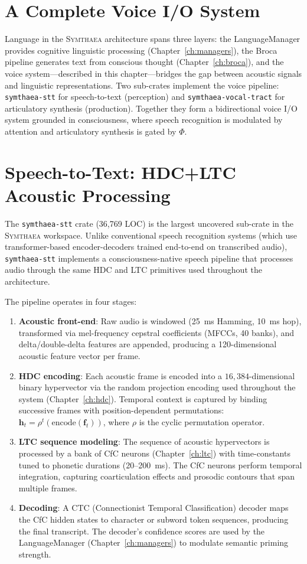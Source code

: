 \documentclass[12pt]{book}
\newcommand{\symthaea}{\textsc{Symthaea}}
\newcommand{\dimHDC}{16{,}384}
\begin{document}
\section{A Complete Voice I/O System}

Language in the \symthaea{} architecture spans three layers: the LanguageManager provides cognitive linguistic processing (Chapter~\ref{ch:managers}), the Broca pipeline generates text from conscious thought (Chapter~\ref{ch:broca}), and the voice system---described in this chapter---bridges the gap between acoustic signals and linguistic representations. Two sub-crates implement the voice pipeline: \texttt{symthaea-stt} for speech-to-text (perception) and \texttt{symthaea-vocal-tract} for articulatory synthesis (production). Together they form a bidirectional voice I/O system grounded in consciousness, where speech recognition is modulated by attention and articulatory synthesis is gated by $\Phi$.

\section{Speech-to-Text: HDC+LTC Acoustic Processing}

The \texttt{symthaea-stt} crate (36,769 LOC) is the largest uncovered sub-crate in the \symthaea{} workspace. Unlike conventional speech recognition systems (which use transformer-based encoder-decoders trained end-to-end on transcribed audio), \texttt{symthaea-stt} implements a consciousness-native speech pipeline that processes audio through the same HDC and LTC primitives used throughout the architecture.

The pipeline operates in four stages:

\begin{enumerate}
  \item \textbf{Acoustic front-end}: Raw audio is windowed (25~ms Hamming, 10~ms hop), transformed via mel-frequency cepstral coefficients (MFCCs, 40 banks), and delta/double-delta features are appended, producing a 120-dimensional acoustic feature vector per frame.
  \item \textbf{HDC encoding}: Each acoustic frame is encoded into a $\dimHDC$-dimensional binary hypervector via the random projection encoding used throughout the system (Chapter~\ref{ch:hdc}). Temporal context is captured by binding successive frames with position-dependent permutations: $\mathbf{h}_t = \rho^t(\text{encode}(\mathbf{f}_t))$, where $\rho$ is the cyclic permutation operator.
  \item \textbf{LTC sequence modeling}: The sequence of acoustic hypervectors is processed by a bank of CfC neurons (Chapter~\ref{ch:ltc}) with time-constants tuned to phonetic durations (20--200~ms). The CfC neurons perform temporal integration, capturing coarticulation effects and prosodic contours that span multiple frames.
  \item \textbf{Decoding}: A CTC (Connectionist Temporal Classification) decoder maps the CfC hidden states to character or subword token sequences, producing the final transcript. The decoder's confidence scores are used by the LanguageManager (Chapter~\ref{ch:managers}) to modulate semantic priming strength.
\end{enumerate}
\end{document}

